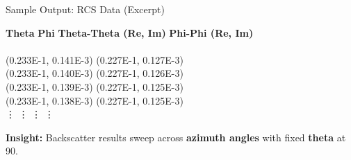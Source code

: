 \begin{frame}{Sample Output: RCS Data (Excerpt)}
\scriptsize
\begin{tabbing}
\hspace{0.8cm} \= \textbf{Theta} \hspace{0.3cm} \= \textbf{Phi} \hspace{0.5cm} \= \textbf{Theta-Theta (Re, Im)} \hspace{0.3cm} \= \textbf{Phi-Phi (Re, Im)} \\
\\
  \> (0.233E-1, 0.141E-3) \> (0.227E-1, 0.127E-3) \\
  \> (0.233E-1, 0.140E-3) \> (0.227E-1, 0.126E-3) \\
  \> (0.233E-1, 0.139E-3) \> (0.227E-1, 0.125E-3) \\
  \> (0.233E-1, 0.138E-3) \> (0.227E-1, 0.125E-3) \\
\> \vdots \> \vdots \> \vdots \> \vdots
\end{tabbing}
\vspace{0.3cm}
\textbf{Insight:} Backscatter results sweep across \textbf{azimuth angles} with fixed \textbf{theta} at 90\textdegree{}.
\end{frame}



\endinput  %
